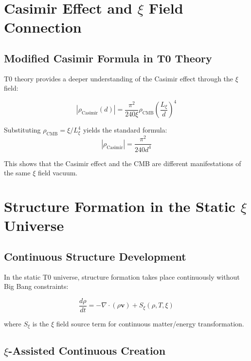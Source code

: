 	\section{Casimir Effect and $\xi$ Field Connection}
	
	\subsection{Modified Casimir Formula in T0 Theory}
	
	T0 theory provides a deeper understanding of the Casimir effect through the $\xi$ field:
	
	\begin{equation}
		|\rho_{\text{Casimir}}(d)| = \frac{\pi^2}{240 \xi} \rho_{\text{CMB}} \left(\frac{L_\xi}{d}\right)^4
	\end{equation}
	
	Substituting $\rho_{\text{CMB}} = \xi/L_\xi^4$ yields the standard formula:
	\begin{equation}
		|\rho_{\text{Casimir}}| = \frac{\pi^2}{240 d^4}
	\end{equation}
	
	This shows that the Casimir effect and the CMB are different manifestations of the same $\xi$ field vacuum.
	
	\section{Structure Formation in the Static $\xi$ Universe}
	
	\subsection{Continuous Structure Development}
	
	In the static T0 universe, structure formation takes place continuously without Big Bang constraints:
	
	\begin{equation}
		\frac{d\rho}{dt} = -\nabla \cdot (\rho \mathbf{v}) + S_\xi(\rho, T, \xi)
	\end{equation}
	
	where $S_\xi$ is the $\xi$ field source term for continuous matter/energy transformation.
	
	\subsection{$\xi$-Assisted Continuous Creation}
	
